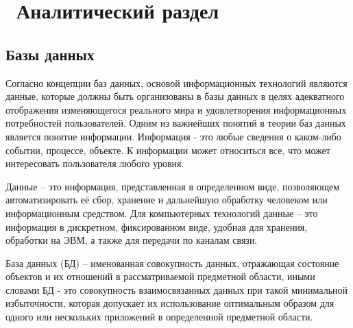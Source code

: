 \chapter{ Аналитический раздел }

\section{Базы данных}
Согласно концепции баз данных, основой информационных технологий являются данные, которые должны быть организованы в базы данных в целях адекватного отображения изменяющегося реального мира и удовлетворения информационных потребностей пользователей. Одним из важнейших понятий в теории баз данных является понятие информации. Информация - это любые сведения о каком-либо событии, процессе, объекте. К информации может относиться все, что может интересовать пользователя любого уровня.

Данные -- это информация, представленная в определенном виде, позволяющем автоматизировать её сбор, хранение и дальнейшую обработку человеком или информационным средством. Для компьютерных технологий данные -- это информация в дискретном, фиксированном виде, удобная для хранения, обработки на ЭВМ, а также для передачи по каналам связи. 

База данных (БД) -- именованная совокупность данных, отражающая состояние объектов и их отношений в рассматриваемой предметной области, иными словами БД - это совокупность взаимосвязанных данных при такой минимальной избыточности, которая допускает их использование оптимальным образом для одного или нескольких приложений в определенной предметной области.

